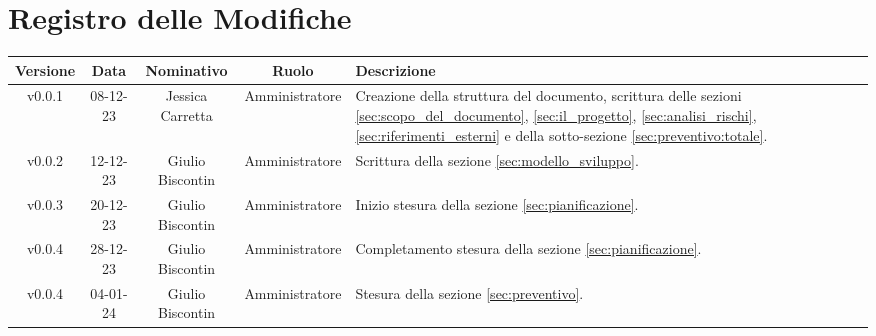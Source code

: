 \section*{\Large Registro delle Modifiche}
    \begin{table}[h]
        \centering
        \renewcommand\tabularxcolumn[1]{m{#1}} %
        \renewcommand{\arraystretch}{1.5}
        \begin{tabularx}{0.98\textwidth}
            {c|c|c|c|>{\centering\arraybackslash}X}
            \rowcolor{black}
            \textbf{\color{white} Versione} & \textbf{\color{white} Data} & \textbf{\color{white} Nominativo} & \textbf{\color{white} Ruolo} & \textbf{\color{white} Descrizione} \\ 
            \hline

            v0.0.1 & 08-12-23 & Jessica Carretta & Amministratore & Creazione della struttura del documento, scrittura delle sezioni \ref{sec:scopo_del_documento}, \ref{sec:il_progetto}, \ref{sec:analisi_rischi}, \ref{sec:riferimenti_esterni} e della sotto-sezione \ref{sec:preventivo:totale}. \\
            
            v0.0.2 & 12-12-23 & Giulio Biscontin & Amministratore & Scrittura della sezione \ref{sec:modello_sviluppo}. \\
            
            v0.0.3 & 20-12-23 & Giulio Biscontin & Amministratore & Inizio stesura della sezione \ref{sec:pianificazione}. \\
            
            v0.0.4 & 28-12-23 & Giulio Biscontin & Amministratore & Completamento stesura della sezione \ref{sec:pianificazione}. \\
            
            v0.0.4 & 04-01-24 & Giulio Biscontin & Amministratore & Stesura della sezione \ref{sec:preventivo}. \\
            \hline
        \end{tabularx}
    \end{table}